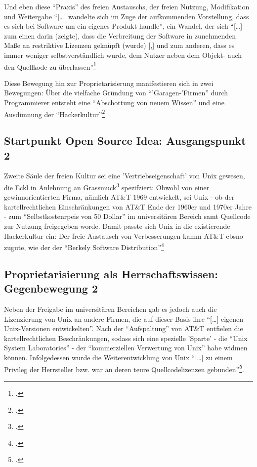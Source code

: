 \documentclass[DIV=calc,BCOR=5mm,11pt,headings=small,oneside,abstract=true, toc=bib]{scrartcl}
\begin{document}
Und eben diese \enquote{Praxis} des freien Austauschs, der freien Nutzung,
Modifikation und Weitergabe \enquote{[\ldots] wandelte sich im Zuge der
aufkommenden Vorstellung, dass es sich bei Software um ein eigenes Produkt
handle}, ein Wandel, der sich \enquote{[\ldots] zum einen darin
(zeigte), dass die Verbreitung der Software in zunehmenden Maße an
restriktive Lizenzen geknüpft (wurde) [,] und zum anderen, dass es immer
weniger selbstverständlich wurde, dem Nutzer neben dem Objekt- auch den
Quellkode zu überlassen}\footcite[vgl.][102]{Eckl2004a}

Diese Bewegung hin zur Proprietarisierung manifestieren sich in zwei Bewegungen:
Über die vielfache Gründung von \enquote{'Garagen-'Firmen} durch
Programmierer entsteht eine \enquote{Abschottung von neuem Wissen} und eine
Ausdünnung der \enquote{Hackerkultur}\footcite[vgl.][103]{Eckl2004a}

\subsection{Startpunkt Open Source Idea: Ausgangspunkt 2}

Zweite Säule der freien Kultur sei eine 'Vertriebseigenschaft' von Unix gewesen,
die Eckl in Anlehnung an Grassmuck\footcite[vgl.][105 Anm 306]{Eckl2004a}
spezifziert: Obwohl von einer gewinnorientierten Firma, nämlich AT\&T
1969 entwickelt, sei Unix - ob der kartellrechtlichen Einschränkungen von AT\&T
Ende der 1960er und 1970er Jahre - zum \enquote{Selbstkostenrpeis von 50
Dollar} im universitären Bereich samt Quellcode zur Nutzung freigegeben
worde. Damit passte sich Unix in die existierende Hackerkultur ein: Der freie
Austausch von Verbesserungen kamm AT\&T ebsno zugute, wie der der \enquote{Berkely
Software Distribution}\footcite[vgl.][105f]{Eckl2004a}

\subsection{Proprietarisierung als Herrschaftswissen: Gegenbewegung 2}

Neben der Freigabe im universitären Bereichen gab es jedoch auch die
Lizenzierung von Unix an andere Firmen, die auf dieser Basis ihre
\enquote{[\ldots] eigenen Unix-Versionen entwickelten}. Nach der
\enquote{Aufspaltung} von AT\&T entfielen die kartellrechtlichen
Beschränkungen, sodass sich eine spezielle 'Sparte' - die \enquote{Unix System
Laboratories} - der \enquote{kommerziellen Verwertung von
Unix} habe widmen können. Infolgedessen wurde die Weiterentwicklung von
Unix \enquote{[\ldots] zu einem Privileg der Herrsteller bzw. war an deren
teure Quellcodelizenzen gebunden}\footcite[vgl.][106]{Eckl2004a}.
\end{document}

